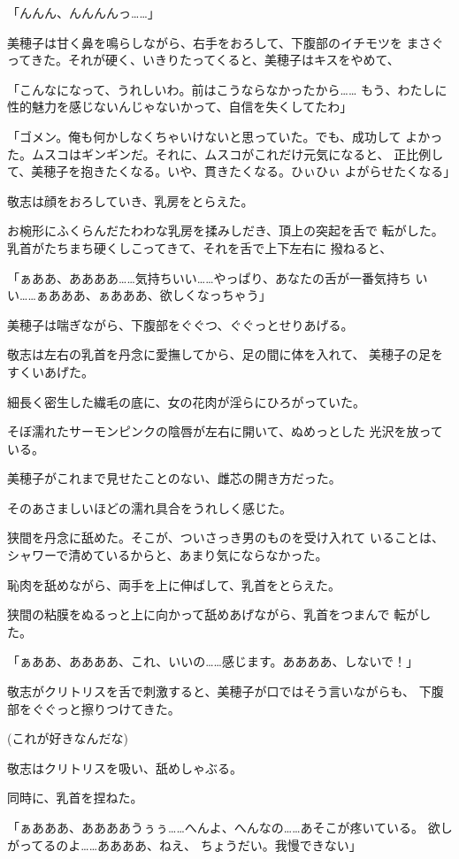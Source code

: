 ﻿\documentclass[
    book,tate,
    line_length=30zw,
    jafontsize=12pt,
    paper=b5j,
    landscape,
    ]{jlreq}
\begin{document}
「んんん、んんんんっ……」

美穂子は甘く鼻を鳴らしながら、右手をおろして、下腹部のイチモツを
まさぐってきた。それが硬く、いきりたってくると、美穂子はキスをやめて、

「こんなになって、うれしいわ。前はこうならなかったから……
もう、わたしに性的魅力を感じないんじゃないかって、自信を失くしてたわ」

「ゴメン。俺も何かしなくちゃいけないと思っていた。でも、成功して
よかった。ムスコはギンギンだ。それに、ムスコがこれだけ元気になると、
正比例して、美穂子を抱きたくなる。いや、貫きたくなる。ひぃひぃ
よがらせたくなる」

敬志は顔をおろしていき、乳房をとらえた。

お椀形にふくらんだたわわな乳房を揉みしだき、頂上の突起を舌で
転がした。乳首がたちまち硬くしこってきて、それを舌で上下左右に
撥ねると、

「ぁああ、ああああ……気持ちいい……やっぱり、あなたの舌が一番気持ち
いい……ぁあああ、ぁあああ、欲しくなっちゃう」

美穂子は喘ぎながら、下腹部をぐぐつ、ぐぐっとせりあげる。

敬志は左右の乳首を丹念に愛撫してから、足の間に体を入れて、
美穂子の足をすくいあげた。

細長く密生した繊毛の底に、女の花肉が淫らにひろがっていた。

そぼ濡れたサーモンピンクの陰唇が左右に開いて、ぬめっとした
光沢を放っている。

美穂子がこれまで見せたことのない、雌芯の開き方だった。

そのあさましいほどの濡れ具合をうれしく感じた。

狭間を丹念に舐めた。そこが、ついさっき男のものを受け入れて
いることは、シャワーで清めているからと、あまり気にならなかった。

恥肉を舐めながら、両手を上に伸ばして、乳首をとらえた。

狭間の粘膜をぬるっと上に向かって舐めあげながら、乳首をつまんで
転がした。

「ぁああ、ああああ、これ、いいの……感じます。ああああ、しないで！」

敬志がクリトリスを舌で刺激すると、美穂子が口ではそう言いながらも、
下腹部をぐぐっと擦りつけてきた。

(これが好きなんだな)

敬志はクリトリスを吸い、舐めしゃぶる。

同時に、乳首を捏ねた。

「ぁあああ、ああああうぅぅ……へんよ、へんなの……あそこが疼いている。
欲しがってるのよ……ああああ、ねえ、 ちょうだい。我慢できない」
\end{document}
